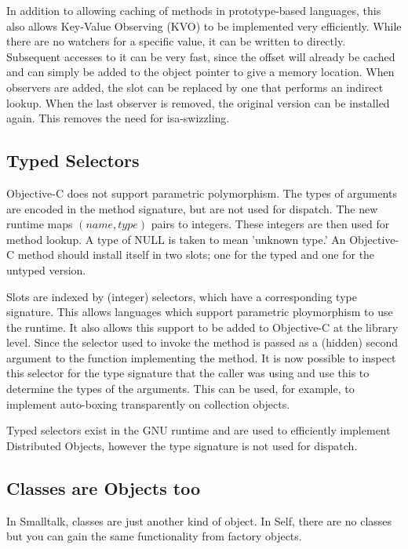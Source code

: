 \documentclass[10pt]{article}
\begin{document}
				In addition to allowing caching of methods in prototype-based languages, this also allows Key-Value Observing (KVO) to be implemented very efficiently.  While there are no watchers for a specific value, it can be written to directly.  Subsequent accesses to it can be very fast, since the offset will already be cached and can simply be added to the object pointer to give a memory location.  When observers are added, the slot can be replaced by one that performs an indirect lookup.  When the last observer is removed, the original version can be installed again.  This removes the need for isa-swizzling.

			\subsection{Typed Selectors}

				Objective-C does not support parametric polymorphism.  The types of arguments are encoded in the method signature, but are not used for dispatch.  The new runtime maps $(name, type)$ pairs to integers.  These integers are then used for method lookup.  A type of NULL is taken to mean 'unknown type.'  An Objective-C method should install itself in two slots; one for the typed and one for the untyped version.

				Slots are indexed by (integer) selectors, which have a corresponding type signature.  This allows languages which support parametric ploymorphism to use the runtime.  It also allows this support to be added to Objective-C at the library level.  Since the selector used to invoke the method is passed as a (hidden) second argument to the function implementing the method.  It is now possible to inspect this selector for the type signature that the caller was using and use this to determine the types of the arguments.  This can be used, for example, to implement auto-boxing transparently on collection objects.

				Typed selectors exist in the GNU runtime and are used to efficiently implement Distributed Objects, however the type signature is not used for dispatch.

			\subsection{Classes are Objects too}

				In Smalltalk, classes are just another kind of object.  In Self, there are no classes but you can gain the same functionality from factory objects.  
\end{document}
